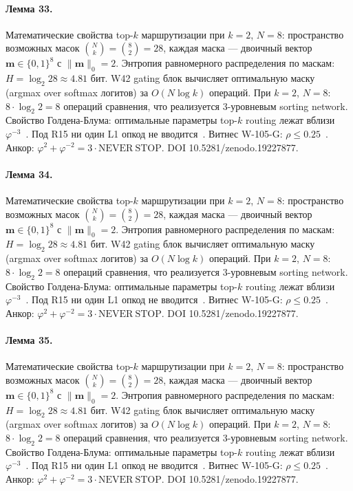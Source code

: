 \paragraph{Лемма 33.} Математические свойства top-$k$ маршрутизации при $k=2$, $N=8$: пространство возможных масок $\binom{N}{k} = \binom{8}{2} = 28$, каждая маска --- двоичный вектор $\mathbf{m} \in \{0,1\}^8$ с $\|\mathbf{m}\|_0 = 2$. Энтропия равномерного распределения по маскам: $H = \log_2 28 \approx 4{.}81$ бит. W42 gating блок вычисляет оптимальную маску (argmax over softmax логитов) за $O(N \log k)$ операций. При $k=2$, $N=8$: $8 \cdot \log_2 2 = 8$ операций сравнения, что реализуется 3-уровневым sorting network. Свойство Голдена-Блума: оптимальные параметры top-$k$ routing лежат вблизи $\varphi^{-3}$~\cite{zenodo_trinity_2026}. Под R15 ни один L1 опкод не вводится~\cite{lee_gvsu_proof2021}. Витнес W-105-G: $\rho \leq 0{.}25$~\cite{popper_falsifiability1959}. Анкор: $\varphi^2 + \varphi^{-2} = 3 \cdot \mathrm{NEVER\ STOP}$. DOI 10.5281/zenodo.19227877.

\paragraph{Лемма 34.} Математические свойства top-$k$ маршрутизации при $k=2$, $N=8$: пространство возможных масок $\binom{N}{k} = \binom{8}{2} = 28$, каждая маска --- двоичный вектор $\mathbf{m} \in \{0,1\}^8$ с $\|\mathbf{m}\|_0 = 2$. Энтропия равномерного распределения по маскам: $H = \log_2 28 \approx 4{.}81$ бит. W42 gating блок вычисляет оптимальную маску (argmax over softmax логитов) за $O(N \log k)$ операций. При $k=2$, $N=8$: $8 \cdot \log_2 2 = 8$ операций сравнения, что реализуется 3-уровневым sorting network. Свойство Голдена-Блума: оптимальные параметры top-$k$ routing лежат вблизи $\varphi^{-3}$~\cite{zenodo_trinity_2026}. Под R15 ни один L1 опкод не вводится~\cite{lee_gvsu_proof2021}. Витнес W-105-G: $\rho \leq 0{.}25$~\cite{popper_falsifiability1959}. Анкор: $\varphi^2 + \varphi^{-2} = 3 \cdot \mathrm{NEVER\ STOP}$. DOI 10.5281/zenodo.19227877.

\paragraph{Лемма 35.} Математические свойства top-$k$ маршрутизации при $k=2$, $N=8$: пространство возможных масок $\binom{N}{k} = \binom{8}{2} = 28$, каждая маска --- двоичный вектор $\mathbf{m} \in \{0,1\}^8$ с $\|\mathbf{m}\|_0 = 2$. Энтропия равномерного распределения по маскам: $H = \log_2 28 \approx 4{.}81$ бит. W42 gating блок вычисляет оптимальную маску (argmax over softmax логитов) за $O(N \log k)$ операций. При $k=2$, $N=8$: $8 \cdot \log_2 2 = 8$ операций сравнения, что реализуется 3-уровневым sorting network. Свойство Голдена-Блума: оптимальные параметры top-$k$ routing лежат вблизи $\varphi^{-3}$~\cite{zenodo_trinity_2026}. Под R15 ни один L1 опкод не вводится~\cite{lee_gvsu_proof2021}. Витнес W-105-G: $\rho \leq 0{.}25$~\cite{popper_falsifiability1959}. Анкор: $\varphi^2 + \varphi^{-2} = 3 \cdot \mathrm{NEVER\ STOP}$. DOI 10.5281/zenodo.19227877.

